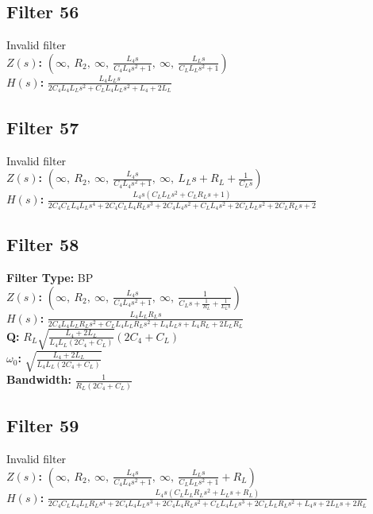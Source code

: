 \documentclass{article}
\begin{document}
\subsection*{Filter 56}
Invalid filter \\ 
\textbf{$Z(s)$:} $\left( \infty, \  R_{2}, \  \infty, \  \frac{L_{4} s}{C_{4} L_{4} s^{2} + 1}, \  \infty, \  \frac{L_{L} s}{C_{L} L_{L} s^{2} + 1}\right)$ \\ 
\textbf{$H(s)$:} $\frac{L_{4} L_{L} s}{2 C_{4} L_{4} L_{L} s^{2} + C_{L} L_{4} L_{L} s^{2} + L_{4} + 2 L_{L}}$ \\ 
\subsection*{Filter 57}
Invalid filter \\ 
\textbf{$Z(s)$:} $\left( \infty, \  R_{2}, \  \infty, \  \frac{L_{4} s}{C_{4} L_{4} s^{2} + 1}, \  \infty, \  L_{L} s + R_{L} + \frac{1}{C_{L} s}\right)$ \\ 
\textbf{$H(s)$:} $\frac{L_{4} s \left(C_{L} L_{L} s^{2} + C_{L} R_{L} s + 1\right)}{2 C_{4} C_{L} L_{4} L_{L} s^{4} + 2 C_{4} C_{L} L_{4} R_{L} s^{3} + 2 C_{4} L_{4} s^{2} + C_{L} L_{4} s^{2} + 2 C_{L} L_{L} s^{2} + 2 C_{L} R_{L} s + 2}$ \\ 
\subsection*{Filter 58}
\textbf{Filter Type:} BP \\ 
\textbf{$Z(s)$:} $\left( \infty, \  R_{2}, \  \infty, \  \frac{L_{4} s}{C_{4} L_{4} s^{2} + 1}, \  \infty, \  \frac{1}{C_{L} s + \frac{1}{R_{L}} + \frac{1}{L_{L} s}}\right)$ \\ 
\textbf{$H(s)$:} $\frac{L_{4} L_{L} R_{L} s}{2 C_{4} L_{4} L_{L} R_{L} s^{2} + C_{L} L_{4} L_{L} R_{L} s^{2} + L_{4} L_{L} s + L_{4} R_{L} + 2 L_{L} R_{L}}$ \\ 
\textbf{Q:} $R_{L} \sqrt{\frac{L_{4} + 2 L_{L}}{L_{4} L_{L} \left(2 C_{4} + C_{L}\right)}} \left(2 C_{4} + C_{L}\right)$ \\ 
\textbf{$\omega_0$:} $\sqrt{\frac{L_{4} + 2 L_{L}}{L_{4} L_{L} \left(2 C_{4} + C_{L}\right)}}$ \\ 
\textbf{Bandwidth:} $\frac{1}{R_{L} \left(2 C_{4} + C_{L}\right)}$ \\ 
\subsection*{Filter 59}
Invalid filter \\ 
\textbf{$Z(s)$:} $\left( \infty, \  R_{2}, \  \infty, \  \frac{L_{4} s}{C_{4} L_{4} s^{2} + 1}, \  \infty, \  \frac{L_{L} s}{C_{L} L_{L} s^{2} + 1} + R_{L}\right)$ \\ 
\textbf{$H(s)$:} $\frac{L_{4} s \left(C_{L} L_{L} R_{L} s^{2} + L_{L} s + R_{L}\right)}{2 C_{4} C_{L} L_{4} L_{L} R_{L} s^{4} + 2 C_{4} L_{4} L_{L} s^{3} + 2 C_{4} L_{4} R_{L} s^{2} + C_{L} L_{4} L_{L} s^{3} + 2 C_{L} L_{L} R_{L} s^{2} + L_{4} s + 2 L_{L} s + 2 R_{L}}$ \\ 
\end{document}
